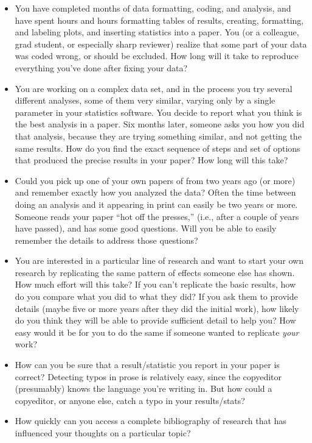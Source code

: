 \documentclass{book}
\begin{document}
\begin{itemize}
\item You have completed months of data formatting, coding, and analysis, and have spent hours and hours formatting tables of results, creating, formatting, and labeling plots, and inserting statistics into a paper. You (or a colleague, grad student, or especially sharp reviewer) realize that some part of your data was coded wrong, or should be excluded.  How long will it take to reproduce everything you've done after fixing your data?
\item You are working on a complex data set, and in the process you try several different analyses, some of them very similar, varying only by a single parameter in your statistics software.  You decide to report what you think is the best analysis in a paper. Six months later, someone asks you how you did that analysis, because they are trying something similar, and not getting the same results. How do you find the exact sequence of steps and set of options that produced the precise results in your paper? How long will this take?
\item Could you pick up one of your own papers of from two years ago (or more) and remember exactly how you analyzed the data?  Often the time between doing an analysis and it appearing in print can easily be two years or more.  Someone reads your paper ``hot off the presses,'' (i.e., after a couple of years have passed), and has some good questions.  Will you be able to easily remember the details to address those questions?
\item You are interested in a particular line of research and want to start your own research by replicating the same pattern of effects someone else has shown. How much effort will this take? If you can't replicate the basic results, how do you compare what you did to what they did?  If you ask them to provide details (maybe five or more years after they did the initial work), how likely do you think they will be able to provide sufficient detail to help you?  How easy would it be for you to do the same if someone wanted to replicate \emph{your} work?
\item How can you be sure that a result/statistic you report in your paper is correct? Detecting typos in prose is relatively easy, since the copyeditor (presumably) knows the language you're writing in. But how could a copyeditor, or anyone else, catch a typo in your results/stats?
\item How quickly can you access a complete bibliography of research that has influenced your thoughts on a particular topic?

\end{itemize}
\end{document}
